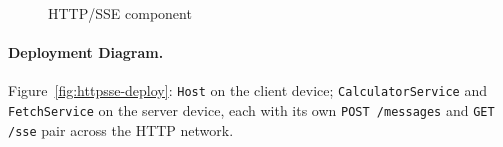 \begin{figure}[htbp]
\centering
{}
\caption{HTTP/SSE component}
\label{fig:httpsse-component}
\end{figure}

\paragraph{Deployment Diagram.}
Figure~\ref{fig:httpsse-deploy}: \texttt{Host} on the client device; \texttt{CalculatorService} and \texttt{FetchService} on the server device, each with its own \texttt{POST /messages} and \texttt{GET /sse} pair across the HTTP network.

